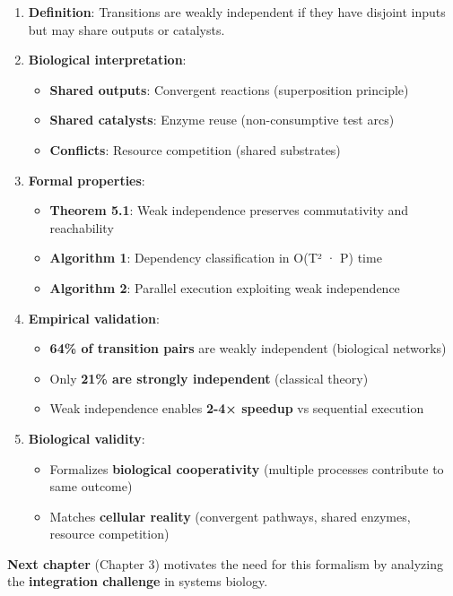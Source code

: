 \begin{enumerate}
\def\labelenumi{\arabic{enumi}.}
\item
  \textbf{Definition}: Transitions are weakly independent if they have
  disjoint inputs but may share outputs or catalysts.
\item
  \textbf{Biological interpretation}:

  \begin{itemize}
  \tightlist
  \item
    \textbf{Shared outputs}: Convergent reactions (superposition
    principle)
  \item
    \textbf{Shared catalysts}: Enzyme reuse (non-consumptive test arcs)
  \item
    \textbf{Conflicts}: Resource competition (shared substrates)
  \end{itemize}
\item
  \textbf{Formal properties}:

  \begin{itemize}
  \tightlist
  \item
    \textbf{Theorem 5.1}: Weak independence preserves commutativity and
    reachability
  \item
    \textbf{Algorithm 1}: Dependency classification in
    O(\textbar T\textbar² · \textbar P\textbar) time
  \item
    \textbf{Algorithm 2}: Parallel execution exploiting weak
    independence
  \end{itemize}
\item
  \textbf{Empirical validation}:

  \begin{itemize}
  \tightlist
  \item
    \textbf{64\% of transition pairs} are weakly independent (biological
    networks)
  \item
    Only \textbf{21\% are strongly independent} (classical theory)
  \item
    Weak independence enables \textbf{2-4× speedup} vs sequential
    execution
  \end{itemize}
\item
  \textbf{Biological validity}:

  \begin{itemize}
  \tightlist
  \item
    Formalizes \textbf{biological cooperativity} (multiple processes
    contribute to same outcome)
  \item
    Matches \textbf{cellular reality} (convergent pathways, shared
    enzymes, resource competition)
  \end{itemize}
\end{enumerate}

\textbf{Next chapter} (Chapter 3) motivates the need for this formalism
by analyzing the \textbf{integration challenge} in systems biology.
